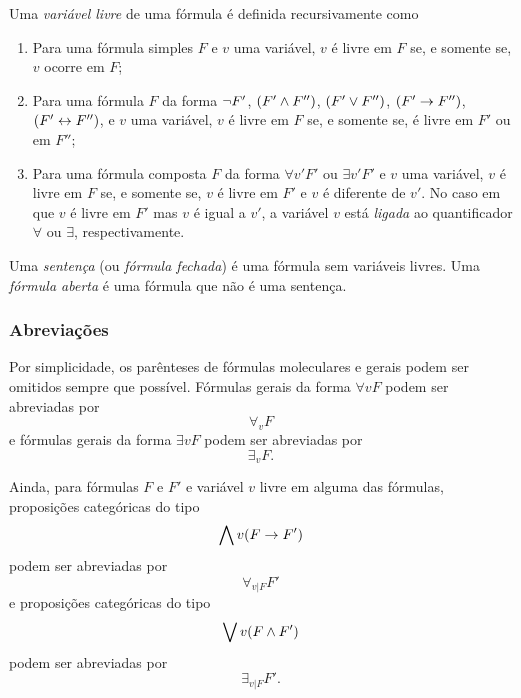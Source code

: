 Uma \emph{variável livre} de uma fórmula é definida recursivamente como
	\begin{enumerate}
	\item Para uma fórmula simples $F$ e $v$ uma variável, $v$ é livre em $F$ se, e somente se, $v$ ocorre em $F$;
	
	\item Para uma fórmula $F$ da forma $\lnot F'$, $(F' \land F'')$, $(F' \lor F'')$, $(F' \rightarrow F'')$, $(F' \leftrightarrow F'')$, e $v$ uma variável, $v$ é livre em $F$ se, e somente se, é livre em $F'$ ou em $F''$;
	
	\item Para uma fórmula composta $F$ da forma $\forall v' F'$ ou $\exists v' F'$ e $v$ uma variável, $v$ é livre em $F$ se, e somente se, $v$ é livre em $F'$ e $v$ é diferente de $v'$. No caso em que $v$ é livre em $F'$ mas $v$ é igual a $v'$, a variável $v$ está \emph{ligada} ao quantificador $\forall$ ou $\exists$, respectivamente.
	\end{enumerate}

Uma \emph{sentença} (ou \emph{fórmula fechada}) é uma fórmula sem variáveis livres. Uma \emph{fórmula aberta} é uma fórmula que não é uma sentença.

\subsubsection{Abreviações}

Por simplicidade, os parênteses de fórmulas moleculares e gerais podem ser omitidos sempre que possível. Fórmulas gerais da forma $\forall v F$ podem ser abreviadas por
	\begin{equation*}
	\forall_v F
	\end{equation*}
e fórmulas gerais da forma $\exists v F$ podem ser abreviadas por
	\begin{equation*}
	\exists_v F.
	\end{equation*}

Ainda, para fórmulas $F$ e $F'$ e variável $v$ livre em alguma das fórmulas, proposições categóricas do tipo
	\begin{equation*}
	\bigwedge\nolimits v(F \rightarrow F')
	\end{equation*}
podem ser abreviadas por
	\begin{equation*}
	\forall_{v | F} F'
	\end{equation*}
e proposições categóricas do tipo
	\begin{equation*}
	\bigvee\nolimits v(F \land F')
	\end{equation*}
podem ser abreviadas por
	\begin{equation*}
	\exists_{v | F} F'.
	\end{equation*}

